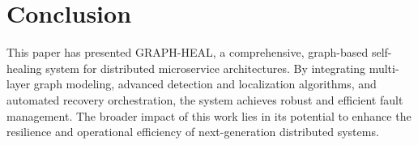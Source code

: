 \documentclass[11pt,twocolumn]{article}
\begin{document}
\section{Conclusion}
This paper has presented GRAPH-HEAL, a comprehensive, graph-based self-healing system for distributed microservice architectures. By integrating multi-layer graph modeling, advanced detection and localization algorithms, and automated recovery orchestration, the system achieves robust and efficient fault management. The broader impact of this work lies in its potential to enhance the resilience and operational efficiency of next-generation distributed systems.


% 
\end{document}
